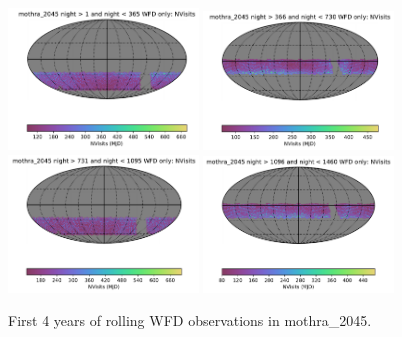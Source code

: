 \documentclass[DM,authoryear,toc]{lsstdoc}
\begin{document}
\begin{figure}[ht]
\centering
\includegraphics[width=0.45\textwidth]{figures/mothra_2045_NVisits_night_gt_1_and_night_lt_365_WFD_only_HEAL_SkyMap.pdf}
\includegraphics[width=0.45\textwidth]{figures/mothra_2045_NVisits_night_gt_366_and_night_lt_730_WFD_only_HEAL_SkyMap.pdf}\\
\includegraphics[width=0.45\textwidth]{figures/mothra_2045_NVisits_night_gt_731_and_night_lt_1095_WFD_only_HEAL_SkyMap.pdf}
\includegraphics[width=0.45\textwidth]{figures/mothra_2045_NVisits_night_gt_1096_and_night_lt_1460_WFD_only_HEAL_SkyMap.pdf}
\caption{First 4 years of rolling WFD observations in  mothra\_2045.}
\label{fig:rolling_nvis-2045}
\end{figure}
\end{document}
